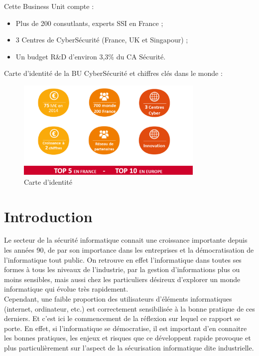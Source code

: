 \documentclass[a4paper]{memoir}
\begin{document}
Cette Business Unit compte : 

\begin{itemize}
\item Plus de 200 consutlants, experts SSI en France ;
\item 3 Centres de CyberSécurité (France, UK et Singapour) ;
\item Un budget R\&D d'environ 3,3\% du CA Sécurité.
\end{itemize}

Carte d’identité de la BU CyberSécurité et chiffres clés dans le monde :

\begin{figure}[!ht]
    \center
    \includegraphics[width=0.8\textwidth]{./images/sopra5.png}
    \caption{Carte d'identité}
    \label{ID}
\end{figure}

\cleardoublepage
\tableofcontents*


\mainmatter%


\chapter*{Introduction}

Le secteur de la sécurité informatique connait une croissance importante depuis les années 90, de par son importance dans les entreprises et la démocratisation de l'informatique tout public. On retrouve en effet l'informatique dans toutes ses formes à tous les niveaux de l'industrie, par la gestion d'informations plus ou moins sensibles, mais aussi chez les particuliers désireux d'explorer un monde informatique qui évolue très rapidement.\\

Cependant, une faible proportion des utilisateurs d'éléments informatiques (internet, ordinateur, etc.) est correctement sensibilisée à la bonne pratique de ces derniers. Et c'est ici le commencement de la réflexion sur lequel ce rapport se porte. En effet, si l'informatique se démocratise, il est important d'en connaitre les bonnes pratiques, les enjeux et risques que ce développent rapide provoque et plus particulièrement sur l'aspect de la sécurisation informatique dite industrielle.
\end{document}

